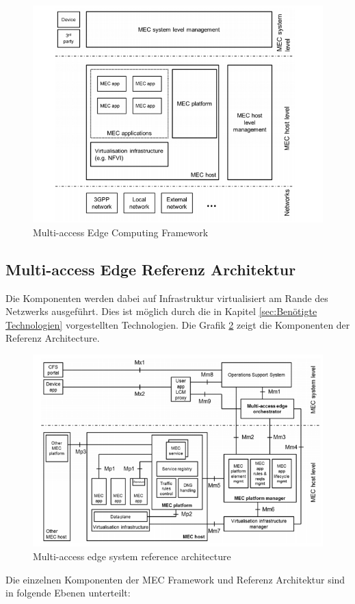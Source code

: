 \documentclass[runningheads]{llncs}
\numberwithin{figure}{section}
\begin{document}
\begin{figure}
  \includegraphics[width=\linewidth]{images/MecFramework.png}
  \caption{Multi-access Edge Computing Framework}
  \label{fig:MecFramework}
\end{figure}

\subsection{Multi-access Edge Referenz Architektur}
Die Komponenten werden dabei auf Infrastruktur virtualisiert am Rande des Netzwerks ausgeführt. 
Dies ist möglich durch die in Kapitel \ref{sec:Benötigte Technologien} vorgestellten Technologien.
Die Grafik \ref{fig:mecarchitecture} zeigt die Komponenten der Referenz Architecture.
\begin{figure}
  \includegraphics[width=\linewidth]{images/mecarchitecture.png}
  \caption{Multi-access edge system reference architecture }
  \label{fig:mecarchitecture}
\end{figure}
Die einzelnen Komponenten der MEC Framework und Referenz Architektur sind in folgende Ebenen unterteilt:
\end{document}
